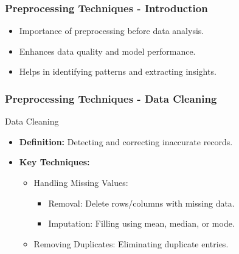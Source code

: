 \documentclass[aspectratio=169]{beamer}
\begin{document}
\begin{frame}[fragile]
    \frametitle{Preprocessing Techniques - Introduction}
    \begin{itemize}
        \item Importance of preprocessing before data analysis.
        \item Enhances data quality and model performance.
        \item Helps in identifying patterns and extracting insights.
    \end{itemize}
\end{frame}

\begin{frame}[fragile]
    \frametitle{Preprocessing Techniques - Data Cleaning}
    \begin{block}{Data Cleaning}
        \begin{itemize}
            \item \textbf{Definition:} Detecting and correcting inaccurate records.
            \item \textbf{Key Techniques:}
                \begin{itemize}
                    \item Handling Missing Values:
                        \begin{itemize}
                            \item Removal: Delete rows/columns with missing data.
                            \item Imputation: Filling using mean, median, or mode.
                        \end{itemize}
                    \item Removing Duplicates: Eliminating duplicate entries.
                \end{itemize}
        \end{itemize}
    \end{block}
\end{frame}
\end{document}
